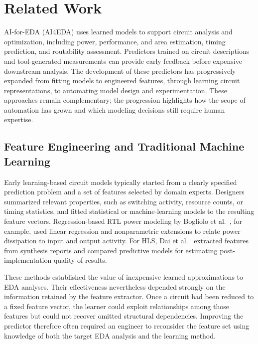 \section{Related Work}
\label{background}

AI-for-EDA (AI4EDA) uses learned models to support circuit analysis and optimization, including power, performance, and area estimation, timing prediction, and routability assessment. Predictors trained on circuit descriptions and tool-generated measurements can provide early feedback before expensive downstream analysis. The development of these predictors has progressively expanded from fitting models to engineered features, through learning circuit representations, to automating model design and experimentation. These approaches remain complementary; the progression highlights how the scope of automation has grown and which modeling decisions still require human expertise.

\subsection{Feature Engineering and Traditional Machine Learning}
\label{sec:feature_based_modeling}

Early learning-based circuit models typically started from a clearly specified prediction problem and a set of features selected by domain experts. Designers summarized relevant properties, such as switching activity, resource counts, or timing statistics, and fitted statistical or machine-learning models to the resulting feature vectors. Regression-based RTL power modeling by Bogliolo et al.~\cite{bogliolo2000regression}, for example, used linear regression and nonparametric extensions to relate power dissipation to input and output activity. For HLS, Dai et al.~\cite{dai2018fast} extracted features from synthesis reports and compared predictive models for estimating post-implementation quality of results.

These methods established the value of inexpensive learned approximations to EDA analyses. Their effectiveness nevertheless depended strongly on the information retained by the feature extractor. Once a circuit had been reduced to a fixed feature vector, the learner could exploit relationships among those features but could not recover omitted structural dependencies. Improving the predictor therefore often required an engineer to reconsider the feature set using knowledge of both the target EDA analysis and the learning method.

